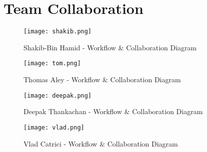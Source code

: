\chapter{Team Collaboration}
\label{appendix:team-collaboration}

\begin{figure}[!hbt]
  	\centering
 	\texttt{[image: shakib.png]}
  	\caption{Shakib-Bin Hamid - Workflow \& Collaboration Diagram}
 	\label{fig:shakib-collaboration}
\end{figure}

\begin{figure}[!hbt]
  	\centering
 	\texttt{[image: tom.png]}
  	\caption{Thomas Aley - Workflow \& Collaboration Diagram}
 	\label{fig:tom-collaboration}
\end{figure}

\begin{figure}[!hbt]
  	\centering
 	\texttt{[image: deepak.png]}
  	\caption{Deepak Thankachan - Workflow \& Collaboration Diagram}
 	\label{fig:deepak-collaboration}
\end{figure}

\begin{figure}[!hbt]
  	\centering
 	\texttt{[image: vlad.png]}
  	\caption{Vlad Catrici - Workflow \& Collaboration Diagram}
 	\label{fig:vlad-collaboration}
\end{figure}
